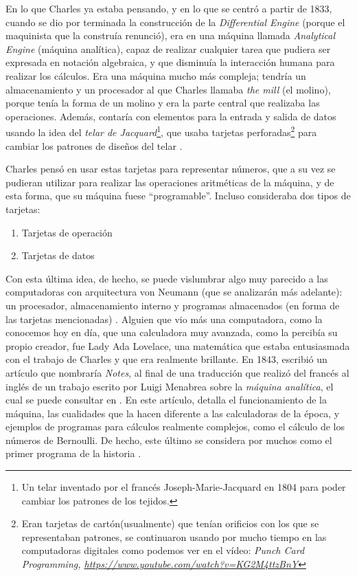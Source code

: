 \documentclass[letterpaper,12pt,oneside]{book}
\begin{document}
		En lo que Charles ya estaba pensando, y en lo que se centró a partir de 1833, cuando se dio por terminada la construcción de la \textit{Differential Engine} (porque el maquinista que la 
		construía renunció), era en una máquina llamada  \textit{Analytical Engine} (máquina analítica), capaz de realizar cualquier tarea que pudiera
		ser expresada en notación algebraica,  y que disminuía la interacción humana para realizar los cálculos.   Era una máquina mucho más compleja; tendría un
		almacenamiento y un procesador al que Charles llamaba \textit{the mill} (el molino), porque tenía la forma de un molino y era la parte central que realizaba las operaciones. Además,
		contaría con elementos para la entrada y salida de datos usando la idea del \textit{telar de Jacquard}\footnote{Un telar inventado por el francés Joseph-Marie-Jacquard en 1804 para poder cambiar los patrones de los tejidos.}, que usaba tarjetas perforadas\footnote{Eran tarjetas de 
		cartón(usualmente) que tenían orificios con los que se representaban patrones, se continuaron usando por mucho tiempo en las computadoras digitales como podemos ver en 
		el vídeo: \emph{Punch Card Programming, \url{https://www.youtube.com/watch?v=KG2M4ttzBnY} }}
		para cambiar los patrones de diseños del telar \cite{oregan_brief_2012}.
  
        Charles pensó en usar estas tarjetas para representar números, que a su vez se pudieran utilizar para realizar las operaciones
		aritméticas de la máquina, y de esta forma,  que su máquina fuese ``programable''. Incluso consideraba dos tipos de tarjetas:
		
		\begin{enumerate}
			\item Tarjetas de operación
			\item Tarjetas de datos
		\end{enumerate}
		
		Con esta última idea, de hecho, se puede vislumbrar algo muy parecido a las computadoras con arquitectura von Neumann (que se analizarán más adelante): un procesador, almacenamiento interno y 
		programas almacenados (en forma de las tarjetas mencionadas) \cite[p.204]{oregan_brief_2012}. 
        Alguien que vio más una computadora, como la conocemos hoy en día, que una calculadora muy avanzada, como la percibía
        su propio creador, fue  Lady Ada Lovelace, una matemática
		que estaba entusiasmada con el trabajo de Charles y que era realmente brillante. En 1843, escribió un artículo que 
		nombraría \textit{Notes}, al final de una traducción  que realizó del francés al inglés de un trabajo
		 escrito por Luigi Menabrea sobre la \textit{máquina analítica}, el cual se puede consultar en \cite{lovelace_scientific_1843}. En este artículo, detalla el funcionamiento de la máquina, las cualidades que la 
		hacen diferente a las calculadoras de la época, y
		ejemplos de programas para cálculos realmente complejos, como el cálculo de los números de Bernoulli. De hecho, este último se considera por muchos como
		el primer programa de la historia \cite{eric_kim_ada_1999}.
  
\end{document}
